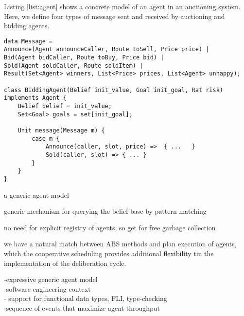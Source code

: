 Listing \ref{list:agent} shows a concrete model of an agent  in an auctioning system.
Here, we define four types of message sent and received by auctioning and bidding agents. 


\begin{lstlisting}[caption= Agent Model, label=list:agent]
data Message = 
Announce(Agent announceCaller, Route toSell, Price price) | 
Bid(Agent bidCaller, Route toBuy, Price bid) |
Sold(Agent soldCaller, Route soldItem) |
Result(Set<Agent> winners, List<Price> prices, List<Agent> unhappy);

class BiddingAgent(Belief init_value, Goal init_goal, Rat risk) implements Agent {
	Belief belief = init_value;
	Set<Goal> goals = set[init_goal];
	
	Unit message(Message m) {
		case m {
			Announce(caller, slot, price) =>  { ...   } 
		    Sold(caller, slot) => { ... }
		}
	}
}
\end{lstlisting}


a generic agent model

generic mechanism for querying the belief base by pattern matching 

no need for explicit registry of agents, so get for free garbage collection

we have a natural match between ABS methods and plan execution of agents, which the cooperative scheduling provides additional flexibility tin the implementation of the deliberation cycle.


-expressive generic agent model \\
-software engineering context \\
- support for functional data types, FLI, type-checking\\
-sequence of events that maximize agent throughput\\


